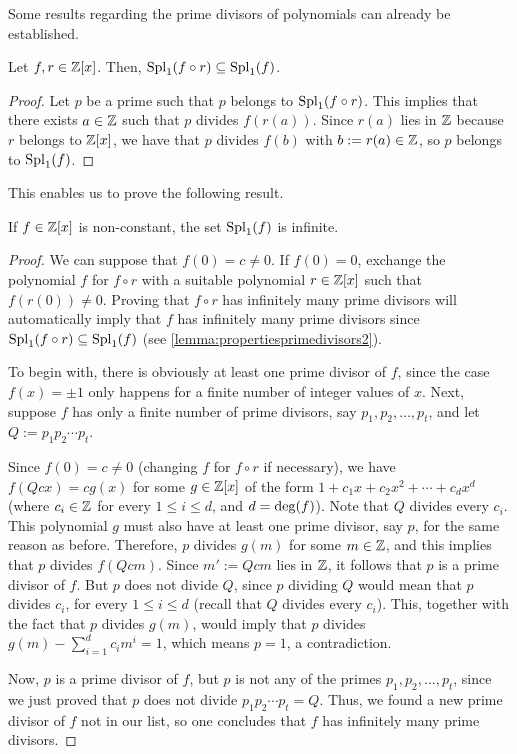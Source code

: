 \documentclass[../main.tex]{subfiles}
\begin{document}
Some results regarding the prime divisors of polynomials can already be established.
  \begin{lemma}\label{lemma:propertiesprimedivisors2}
	Let $f, r\in\mathbb{Z}[x]$. Then,  $\operatorname{Spl}_1(f\circ r)\subseteq \operatorname{Spl}_1(f)$. 
\end{lemma}
\begin{proof}		
	Let $p$ be a prime such that $p$ belongs to $\operatorname{Spl}_1(f\circ r)$. This implies that there exists $a\in\mathbb{Z}$ such that $p$ divides $f(r(a))$. Since $r(a)$ lies in $\mathbb{Z}$ because $r$ belongs to $\mathbb{Z}[x]$, we have that $p$ divides $f(b)$ with $b:=r(a)\in\mathbb{Z}$, so $p$ belongs to $\operatorname{Spl}_1(f)$.
\end{proof}
This enables us to prove the following result.
\begin{proposition}\label{prop:propertiesprimedivisors}
 If $f\in\mathbb{Z}[x]$ is non-constant, the set $\operatorname{Spl}_1(f)$ is infinite.
\end{proposition}
\begin{proof}
		We can suppose that $f(0)=c\neq 0$. If $f(0)=0$, exchange the polynomial $f$ for $f\circ r$ with a suitable polynomial $r\in\mathbb{Z}[x]$ such that $f(r(0))\neq0$. Proving that $f\circ r$ has infinitely many prime divisors will automatically imply that $f$ has infinitely many prime divisors since $\operatorname{Spl}_1(f\circ r)\subseteq \operatorname{Spl}_1(f)$ (see \cref{lemma:propertiesprimedivisors2}).
		
		To begin with, there is obviously at least one prime divisor of $f$, since the case $f(x)=\pm 1$ only happens for a finite number of integer values of $x$. Next, suppose $f$ has only a finite number of prime divisors, say $p_1, p_2,\dots,p_t$, and let $Q:=p_1p_2\cdots p_t$. 
		
		 Since $f(0)=c\neq 0$ (changing $f$ for $f\circ r$ if necessary), we have $f(Qcx)=cg(x)$ for some $g\in\mathbb{Z}[x]$ of the form $1+c_1x+c_2x^2+\cdots+c_dx^d$ (where $c_i\in\mathbb{Z}$ for every $1\leqslant i \leqslant d$, and $d=\operatorname{deg}(f)$). Note that $Q$ divides every $c_i$. This polynomial $g$ must also have at least one prime divisor, say $p$, for the same reason as before. Therefore, $p$ divides $g(m)$ for some $m\in\mathbb{Z}$, and this implies that $p$ divides $f(Qcm)$. Since $m':=Qcm$ lies in $\mathbb{Z}$, it follows that $p$ is a prime divisor of $f$. But $p$ does not divide $Q$, since $p$ dividing $Q$ would mean that $p$ divides $c_i$, for every $1\leqslant i \leqslant d$ (recall that $Q$ divides every $c_i$). This, together with the fact that $p$ divides $g(m)$, would imply that $p$ divides $g(m) - \sum_{i=1}^{d}c_im^i=1$, which means $p=1$, a contradiction. 
		
		Now, $p$ is a prime divisor of $f$, but $p$ is not any of the primes $p_1,p_2,\dots,p_t$, since we just proved that $p$ does not divide $p_1p_2\cdots p_t=Q$. Thus, we found a new prime divisor of $f$ not in our list, so one concludes that $f$ has infinitely many prime divisors.
\end{proof}
\end{document}
